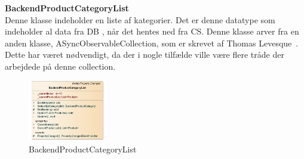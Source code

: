 \textbf{BackendProductCategoryList}\\
Denne klasse indeholder en liste af kategorier. Det er denne datatype som indeholder al data fra \gls{DB} , når det hentes ned fra \gls{CS}. Denne klasse arver fra en anden klasse, ASyncObservableCollection, som er skrevet af Thomas Levesque~\cite{ASYNC}. Dette har været nødvendigt, da der i nogle tilfælde ville være flere tråde der arbejdede på denne collection.
\begin{center}
\begin{figure}[!h]
    \centering
    \includegraphics[width=0.30\textwidth]{Systemdesign/backend/klassebeskrivelser/Images/BPCList.png}
    \caption{BackendProductCategoryList}
    \label{fig:modelhandler}
\end{figure}
\end{center}
\label{Modelhandler_Beskrivelse}
 \bigskip 

